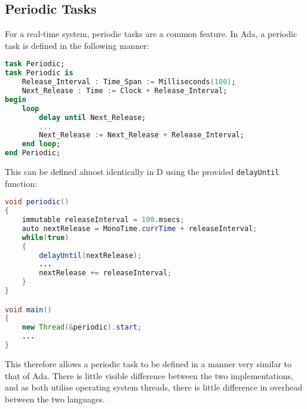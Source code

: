 \subsection{Periodic Tasks}
For a real-time system, periodic tasks are a common feature. In Ada, a periodic
task is defined in the following manner: 
\begin{lstlisting}[language=Ada]
task Periodic; 
task Periodic is 
    Release_Interval : Time_Span := Milliseconds(100); 
    Next_Release : Time := Clock + Release_Interval; 
begin
    loop 
        delay until Next_Release; 
        ... 
        Next_Release := Next_Release + Release_Interval; 
    end loop; 
end Periodic; 
\end{lstlisting}
This can be defined almost identically in D using the provided
\texttt{delayUntil} function: 
\begin{lstlisting}[language=Java]
void periodic()
{
    immutable releaseInterval = 100.msecs; 
    auto nextRelease = MonoTime.currTime + releaseInterval; 
    while(true)
    {
        delayUntil(nextRelease); 
        ...
        nextRelease += releaseInterval; 
    }
}

void main()
{
    new Thread(&periodic).start; 
    ...
}
\end{lstlisting}
This therefore allows a periodic task to be defined in a manner very
similar to that of Ada. There is little visible difference between the two
implementations, and as both utilise operating system threads, there is little
difference in overhead between the two languages. 

